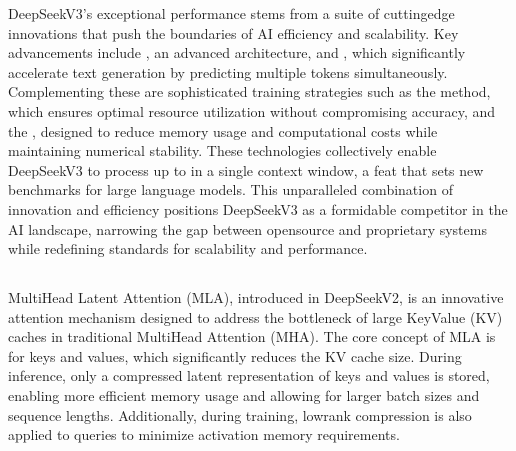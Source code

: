 \documentclass[letterpaper,11pt,english]{sphinxmanual}
\begin{document}
\sphinxAtStartPar
DeepSeek\sphinxhyphen{}V3’s exceptional performance stems from a suite of cutting\sphinxhyphen{}edge
innovations that push the boundaries of AI efficiency and scalability.
Key advancements include , an
advanced  architecture, and , which significantly accelerate text generation by
predicting multiple tokens simultaneously. Complementing these are
sophisticated training strategies such as the  method, which ensures optimal resource utilization without
compromising accuracy, and the ,
designed to reduce memory usage and computational costs while
maintaining numerical stability. These technologies collectively enable
DeepSeek\sphinxhyphen{}V3 to process up to  in a single context
window, a feat that sets new benchmarks for large language models. This
unparalleled combination of innovation and efficiency positions
DeepSeek\sphinxhyphen{}V3 as a formidable competitor in the AI landscape, narrowing
the gap between open\sphinxhyphen{}source and proprietary systems while redefining
standards for scalability and performance. 


\subsection{}
\label{\detokenize{pretraining:architecture}}

\subsubsection{}
\label{\detokenize{pretraining:multi-head-latent-attention-mla}}
\sphinxAtStartPar
Multi\sphinxhyphen{}Head Latent Attention (MLA), introduced in DeepSeek\sphinxhyphen{}V2, is an
innovative attention mechanism designed to address the bottleneck of
large Key\sphinxhyphen{}Value (KV) caches in traditional Multi\sphinxhyphen{}Head Attention (MHA).
The core concept of MLA is  for keys and
values, which significantly reduces the KV cache size. During
inference, only a compressed latent representation of keys and values
is stored, enabling more efficient memory usage and allowing for
larger batch sizes and sequence lengths. Additionally, during
training, low\sphinxhyphen{}rank compression is also applied to queries to minimize
activation memory requirements. 
\end{document}
